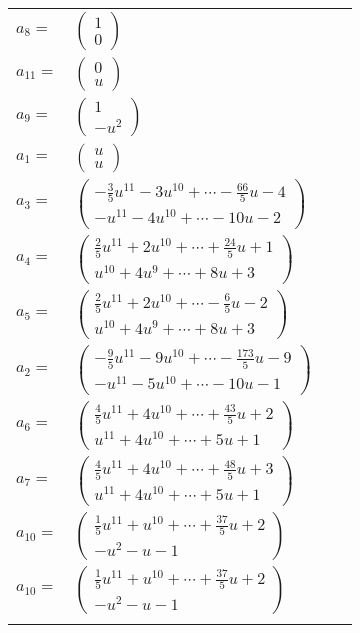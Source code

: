 \documentclass[1p]{elsarticle_modified}
\theoremstyle{definition}
\begin{document}
\begin{tabular}{m{7pt} m{180pt} m{7pt} m{180pt} }
\flushright $a_{8}=$&$\begin{pmatrix}1\\0\end{pmatrix}$ \\
\flushright $a_{11}=$&$\begin{pmatrix}0\\u\end{pmatrix}$ \\
\flushright $a_{9}=$&$\begin{pmatrix}1\\- u^2\end{pmatrix}$ \\
\flushright $a_{1}=$&$\begin{pmatrix}u\\u\end{pmatrix}$ \\
\flushright $a_{3}=$&$\begin{pmatrix}-\frac{3}{5} u^{11}-3 u^{10}+\cdots-\frac{66}{5} u-4\\- u^{11}-4 u^{10}+\cdots-10 u-2\end{pmatrix}$ \\
\flushright $a_{4}=$&$\begin{pmatrix}\frac{2}{5} u^{11}+2 u^{10}+\cdots+\frac{24}{5} u+1\\u^{10}+4 u^9+\cdots+8 u+3\end{pmatrix}$ \\
\flushright $a_{5}=$&$\begin{pmatrix}\frac{2}{5} u^{11}+2 u^{10}+\cdots-\frac{6}{5} u-2\\u^{10}+4 u^9+\cdots+8 u+3\end{pmatrix}$ \\
\flushright $a_{2}=$&$\begin{pmatrix}-\frac{9}{5} u^{11}-9 u^{10}+\cdots-\frac{173}{5} u-9\\- u^{11}-5 u^{10}+\cdots-10 u-1\end{pmatrix}$ \\
\flushright $a_{6}=$&$\begin{pmatrix}\frac{4}{5} u^{11}+4 u^{10}+\cdots+\frac{43}{5} u+2\\u^{11}+4 u^{10}+\cdots+5 u+1\end{pmatrix}$ \\
\flushright $a_{7}=$&$\begin{pmatrix}\frac{4}{5} u^{11}+4 u^{10}+\cdots+\frac{48}{5} u+3\\u^{11}+4 u^{10}+\cdots+5 u+1\end{pmatrix}$ \\
\flushright $a_{10}=$&$\begin{pmatrix}\frac{1}{5} u^{11}+u^{10}+\cdots+\frac{37}{5} u+2\\- u^2- u-1\end{pmatrix}$\\ \flushright $a_{10}=$&$\begin{pmatrix}\frac{1}{5} u^{11}+u^{10}+\cdots+\frac{37}{5} u+2\\- u^2- u-1\end{pmatrix}$\\&\end{tabular}
\end{document}
